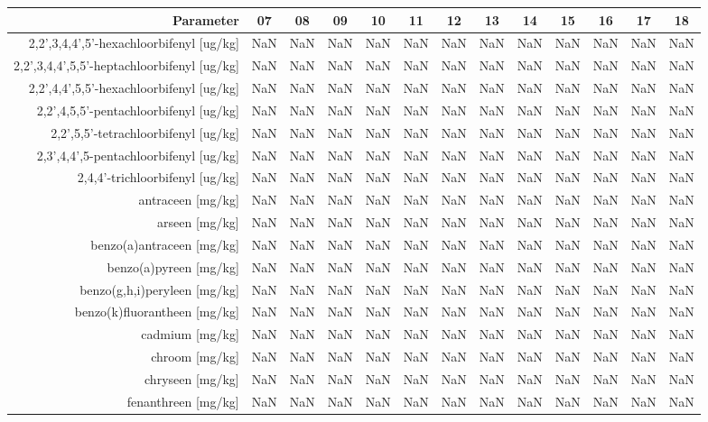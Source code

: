 \begin{tabular}{ r |c | c | c | c | c |c | c | c | c | c | c | c } 
\rowcolor[HTML]{EFEFEF}  
 Parameter & 07 & 08 & 09 & 10 & 11 & 12 & 13 & 14 & 15 & 16 & 17 & 18 \\    \hline     
2,2',3,4,4',5'-hexachloorbifenyl [ug/kg] &NaN & NaN & NaN & NaN & NaN & NaN & NaN & NaN & NaN & NaN & NaN & NaN \\
2,2',3,4,4',5,5'-heptachloorbifenyl [ug/kg] &NaN & NaN & NaN & NaN & NaN & NaN & NaN & NaN & NaN & NaN & NaN & NaN \\
2,2',4,4',5,5'-hexachloorbifenyl [ug/kg] &NaN & NaN & NaN & NaN & NaN & NaN & NaN & NaN & NaN & NaN & NaN & NaN \\
2,2',4,5,5'-pentachloorbifenyl [ug/kg] &NaN & NaN & NaN & NaN & NaN & NaN & NaN & NaN & NaN & NaN & NaN & NaN \\
2,2',5,5'-tetrachloorbifenyl [ug/kg] &NaN & NaN & NaN & NaN & NaN & NaN & NaN & NaN & NaN & NaN & NaN & NaN \\
2,3',4,4',5-pentachloorbifenyl [ug/kg] &NaN & NaN & NaN & NaN & NaN & NaN & NaN & NaN & NaN & NaN & NaN & NaN \\
2,4,4'-trichloorbifenyl [ug/kg] &NaN & NaN & NaN & NaN & NaN & NaN & NaN & NaN & NaN & NaN & NaN & NaN \\
antraceen [mg/kg] &NaN & NaN & NaN & NaN & NaN & NaN & NaN & NaN & NaN & NaN & NaN & NaN \\
arseen [mg/kg] &NaN & NaN & NaN & NaN & NaN & NaN & NaN & NaN & NaN & NaN & NaN & NaN \\
benzo(a)antraceen [mg/kg] &NaN & NaN & NaN & NaN & NaN & NaN & NaN & NaN & NaN & NaN & NaN & NaN \\
benzo(a)pyreen [mg/kg] &NaN & NaN & NaN & NaN & NaN & NaN & NaN & NaN & NaN & NaN & NaN & NaN \\
benzo(g,h,i)peryleen [mg/kg] &NaN & NaN & NaN & NaN & NaN & NaN & NaN & NaN & NaN & NaN & NaN & NaN \\
benzo(k)fluorantheen [mg/kg] &NaN & NaN & NaN & NaN & NaN & NaN & NaN & NaN & NaN & NaN & NaN & NaN \\
cadmium [mg/kg] &NaN & NaN & NaN & NaN & NaN & NaN & NaN & NaN & NaN & NaN & NaN & NaN \\
chroom [mg/kg] &NaN & NaN & NaN & NaN & NaN & NaN & NaN & NaN & NaN & NaN & NaN & NaN \\
chryseen [mg/kg] &NaN & NaN & NaN & NaN & NaN & NaN & NaN & NaN & NaN & NaN & NaN & NaN \\
fenanthreen [mg/kg] &NaN & NaN & NaN & NaN & NaN & NaN & NaN & NaN & NaN & NaN & NaN & NaN \\

\end{tabular}
